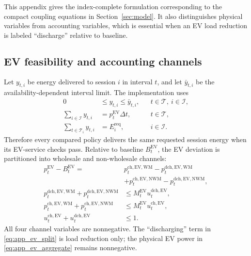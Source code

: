 \documentclass[final,5p,times]{elsarticle}
\newcommand{\dt}{\Delta t}
\newcommand{\EV}{\mathrm{EV}}
\newcommand{\WM}{\mathrm{WM}}
\newcommand{\NWM}{\mathrm{NWM}}
\newcommand{\ch}{\mathrm{ch}}
\newcommand{\dch}{\mathrm{dch}}
\newcommand{\req}{\mathrm{req}}
\newcommand{\calT}{\mathcal{T}}
\newcommand{\calI}{\mathcal{I}}
\begin{document}
This appendix gives the index-complete formulation corresponding to the compact
coupling equations in Section~\ref{sec:model}. It also distinguishes physical
variables from accounting variables, which is essential when an EV load
reduction is labeled ``discharge'' relative to baseline.

\subsection{EV feasibility and accounting channels}
Let $y_{t,i}$ be energy delivered to session $i$ in interval $t$, and let
$\bar y_{t,i}$ be the availability-dependent interval limit. The implementation
uses
\begin{align}
0&\le y_{t,i}\le \bar y_{t,i}, &&t\in\calT,\ i\in\calI, \label{eq:app_ev_interval}\\
\sum_{i\in\calI}y_{t,i}&=p_t^{\EV}\dt, &&t\in\calT, \label{eq:app_ev_aggregate}\\
\sum_{t\in\calT_i}y_{t,i}&=E_i^{\req}, &&i\in\calI. \label{eq:app_ev_energy}
\end{align}
Therefore every compared policy delivers the same requested session energy
when its EV-service checks pass. Relative to baseline $B_t^{\EV}$, the EV
deviation is partitioned into wholesale and non-wholesale channels:
\begin{align}
p_t^{\EV}-B_t^{\EV}
={}&p_t^{\ch,\EV,\WM}-p_t^{\dch,\EV,\WM}\nonumber\\
&+p_t^{\ch,\EV,\NWM}-p_t^{\dch,\EV,\NWM}, \label{eq:app_ev_split}\\
p_t^{\dch,\EV,\WM}+p_t^{\dch,\EV,\NWM}
&\le M_t^{\EV}u_t^{\dch,\EV}, \label{eq:app_ev_dch_binary}\\
p_t^{\ch,\EV,\WM}+p_t^{\ch,\EV,\NWM}
&\le M_t^{\EV}u_t^{\ch,\EV}, \label{eq:app_ev_ch_binary}\\
u_t^{\ch,\EV}+u_t^{\dch,\EV}&\le1. \label{eq:app_ev_direction}
\end{align}
All four channel variables are nonnegative. The ``discharging'' term in
\eqref{eq:app_ev_split} is load reduction only; the physical EV power in
\eqref{eq:app_ev_aggregate} remains nonnegative.
\end{document}
